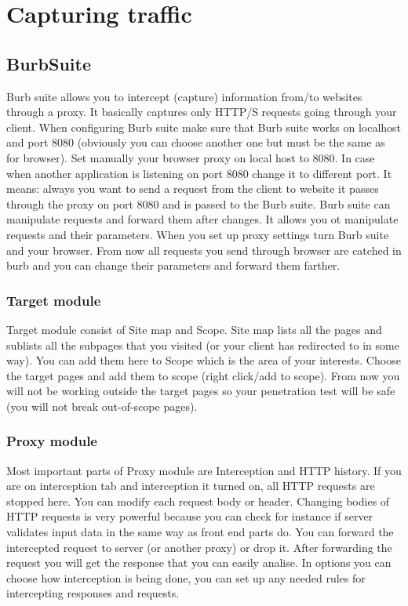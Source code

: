 \section{Capturing traffic}
\label{sec:traffic}

\subsection{BurbSuite}
\label{subsec:burp}

Burb suite allows you to intercept (capture) information from/to websites through a proxy.
It basically captures only HTTP/S requests going through your client.
When configuring Burb suite make sure that Burb suite works on localhost and port 8080 (obviously you can choose another one but must be the same as for browser).
Set manually your browser proxy on local host to 8080.
In case when another application is listening on port 8080 change it to different port.
It means: always you want to send a request from the client to website it passes through the proxy on port 8080 and is passed to the Burb suite.
Burb suite can manipulate requests and forward them after changes.
It allows you ot manipulate requests and their parameters.
When you set up proxy settings turn Burb suite and your browser.
From now all requests you send through browser are catched in burb and you can change their parameters and forward them farther.

\subsubsection{Target module}
Target module consist of Site map and Scope.
Site map lists all the pages and sublists all the subpages that you visited (or your client has redirected to in some way).
You can add them here to Scope which is the area of your interests.
Choose the target pages and add them to scope (right click/add to scope).
From now you will not be working outside the target pages so your penetration test will be safe (you will not break out-of-scope pages).

\subsubsection{Proxy module}
Most important parts of Proxy module are Interception and HTTP history.
If you are on interception tab and interception it turned on, all HTTP requests are stopped here.
You can modify each request body or header.
Changing bodies of HTTP requests is very powerful because you can check for instance if server validates input data in the same way as front end parts do.
You can forward the intercepted request to server (or another proxy) or drop it.
After forwarding the request you will get the response that you can easily analise.
In options you can choose how interception is being done, you can set up any needed rules for intercepting responses and requests.

